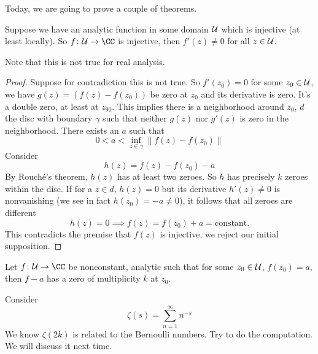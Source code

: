 Today, we are going to prove a couple of theorems.
\begin{thm}
Suppose we have an analytic function in some domain ${\cal U}$
which is injective (at least locally). So $f\colon{\cal U}\to\CC$
is injective, then $f'(z)\not=0$ for all $z\in{\cal U}$. 
\end{thm}
Note that this is not true for real analysis.
\begin{proof}
Suppose for contradiction this is not true. So $f'(z_{0})=0$ for
some $z_{0}\in{\cal U}$, we have $g(z)=(f(z)-f(z_{0}))$ be zero at
$z_{0}$ and its derivative is zero. It's a double zero, at least
at $z_{90}$. This implies there is a neighborhood around $z_{0}$,
  $d$ the disc with boundary $\gamma$ such that neither $g(z)$
  nor $g'(z)$ is zero in the neighborhood. There exists an $a$
  such that
\begin{equation}
0<a<\inf_{z\in\gamma}\|f(z)-f(z_{0})\|
\end{equation}
Consider
\begin{equation}
h(z)=f(z)-f(z_{0})-a
\end{equation}
By Rouch\'e's theorem, $h(z)$ has at least two zeroes. So $h$ has
precisely $k$ zeroes within the disc. If for a $z\in d$, $h(z)=0$
but its derivative $h'(z)\not=0$ is nonvanishing (we see in fact
$h(z_{0})=-a\not=0$), it follows that all zeroes are different
\begin{equation}
h(z)=0\implies f(z)=f(z_{0})+a=\mbox{constant}.
\end{equation}
This contradicts the premise that $f(z)$ is injective, we reject
our initial supposition.
\end{proof}

\begin{thm}
Let $f\colon{\cal U}\to\CC$ be nonconstant, analytic such that
for some $z_{0}\in{\cal U}$, $f(z_{0})=a$, then $f-a$ has a zero
of multiplicity $k$ at $z_{0}$.
\end{thm}

Consider 
\begin{equation}
\zeta(s) = \sum^{\infty}_{n=1}n^{-s}
\end{equation}
We know $\zeta(2k)$ is related to the Bernoulli numbers. Try to
do the computation. We will discuss it next time.

